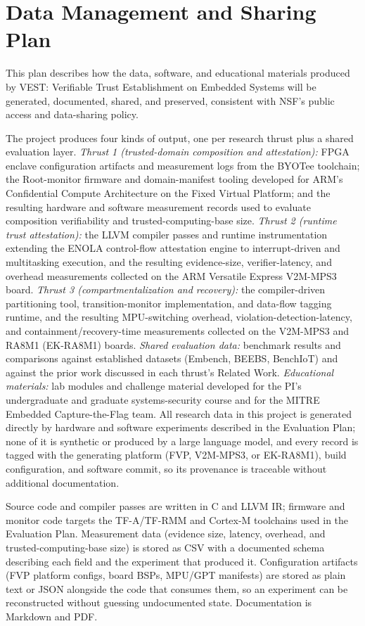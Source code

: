 \documentclass[11pt,onecolumn]{article}
\newcommand{\head}[1]{\noindent{\bf #1}}
\begin{document}
\section*{Data Management and Sharing Plan}

This plan describes how the data, software, and educational materials produced by
VEST: Verifiable Trust Establishment on Embedded Systems will be generated,
documented, shared, and preserved, consistent with NSF's public access and
data-sharing policy.

\head{Data and Software.}
The project produces four kinds of output, one per research thrust plus a shared
evaluation layer.
\emph{Thrust 1 (trusted-domain composition and attestation):} FPGA enclave
configuration artifacts and measurement logs from the BYOTee toolchain; the
Root-monitor firmware and domain-manifest tooling developed for ARM's Confidential
Compute Architecture on the Fixed Virtual Platform; and the resulting hardware and
software measurement records used to evaluate composition verifiability and
trusted-computing-base size.
\emph{Thrust 2 (runtime trust attestation):} the LLVM compiler passes and runtime
instrumentation extending the ENOLA control-flow attestation engine to
interrupt-driven and multitasking execution, and the resulting evidence-size,
verifier-latency, and overhead measurements collected on the ARM Versatile
Express V2M-MPS3 board.
\emph{Thrust 3 (compartmentalization and recovery):} the compiler-driven
partitioning tool, transition-monitor implementation, and data-flow tagging
runtime, and the resulting MPU-switching overhead, violation-detection-latency,
and containment/recovery-time measurements collected on the V2M-MPS3 and
RA8M1 (EK-RA8M1) boards.
\emph{Shared evaluation data:} benchmark results and comparisons against
established datasets (Embench, BEEBS, BenchIoT) and against the prior work discussed in
each thrust's Related Work.
\emph{Educational materials:} lab modules and challenge material developed for
the PI's undergraduate and graduate systems-security course and for the MITRE
Embedded Capture-the-Flag team.
All research data in this project is generated directly by hardware and software
experiments described in the Evaluation Plan; none of it is synthetic or
produced by a large language model, and every record is tagged with the
generating platform (FVP, V2M-MPS3, or EK-RA8M1), build configuration, and
software commit, so its provenance is traceable without additional
documentation.

\head{Standards and Formats.}
Source code and compiler passes are written in C and LLVM IR; firmware and
monitor code targets the TF-A/TF-RMM and Cortex-M toolchains used in the
Evaluation Plan. Measurement data (evidence size, latency, overhead, and
trusted-computing-base size) is stored as CSV with a documented schema
describing each field and the experiment that produced it. Configuration
artifacts (FVP platform configs, board BSPs, MPU/GPT manifests) are stored as
plain text or JSON alongside the code that consumes them, so an experiment can
be reconstructed without guessing undocumented state. Documentation is
Markdown and PDF.
\end{document}
